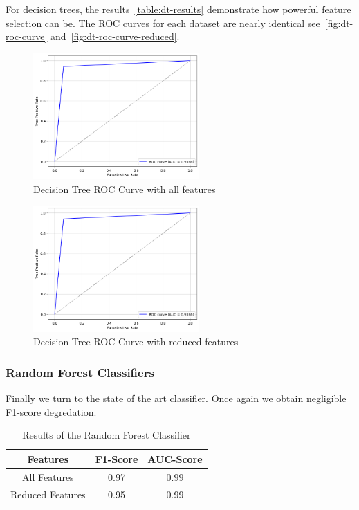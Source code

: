 \documentclass[conference]{IEEEtran}
\begin{document}
For decision trees, the results~\autoref{table:dt-results} demonstrate how powerful feature selection can be. The ROC curves for each dataset are nearly identical see~\autoref{fig:dt-roc-curve} and~\autoref{fig:dt-roc-curve-reduced}.

\begin{figure}[h]
	\begin{center}
		\includegraphics[width=2.5in]{dt-roc-curve}
		\caption{Decision Tree ROC Curve with all features}\label{fig:dt-roc-curve}
	\end{center}
\end{figure}

\begin{figure}[h]
	\begin{center}
		\includegraphics[width=2.5in]{dt-roc-curve-reduced}
		\caption{Decision Tree ROC Curve with reduced features}\label{fig:dt-roc-curve-reduced}
	\end{center}
\end{figure}

\subsubsection{Random Forest Classifiers}

Finally we turn to the state of the art classifier. Once again we obtain negligible F1-score degredation.

\begin{table}[h!]
	\begin{center}
		\begin{tabular}{| c | c c |}
			\hline
			Features         & F1-Score & AUC-Score \\ [0.5ex]
			\hline
			All Features     & 0.97     & 0.99      \\
			Reduced Features & 0.95     & 0.99      \\[1ex]
			\hline
		\end{tabular}
	\end{center}
	\caption{Results of the Random Forest Classifier}
	\label{table:rf-results}
\end{table}
\end{document}
